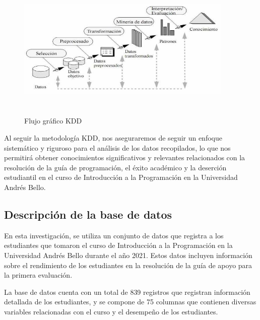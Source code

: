 \begin{figure}[H]
  \centering
  \includegraphics[width=4.06111in,height=2.68611in]{img/KDD.png}
  \caption{Flujo gráfico KDD}
  \label{fig:flujo_kdd}
\end{figure}

Al seguir la metodología KDD, nos aseguraremos de seguir un enfoque sistemático y riguroso para el análisis de los datos recopilados, lo que nos permitirá obtener conocimientos significativos y relevantes relacionados con la resolución de la guía de programación, el éxito académico y la deserción estudiantil en el curso de Introducción a la Programación en la Universidad Andrés Bello.


\subsection{Descripción de la base de datos}

En esta investigación, se utiliza un conjunto de datos que registra a los estudiantes que tomaron el
curso de Introducción a la Programación en la Universidad Andrés Bello durante el año 2021.
Estos datos incluyen información sobre el rendimiento de los estudiantes en la resolución de la guía de apoyo para la primera evaluación.

La base de datos cuenta con un total de 839 registros que registran información detallada de los
estudiantes, y se compone de 75 columnas que contienen diversas variables relacionadas con el curso
y el desempeño de los estudiantes.

